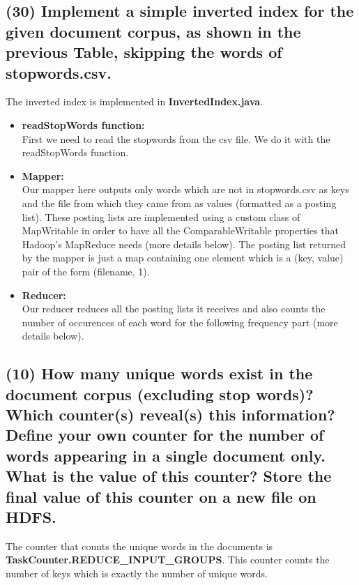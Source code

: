 \documentclass[a4paper,10pt]{article}
\begin{document}
\subsection{(30) Implement a simple inverted index for the given document corpus, as shown in
the previous Table, skipping the words of stopwords.csv.}
The inverted index is implemented in \textbf{InvertedIndex.java}.
\begin{itemize}
  \item \textbf{readStopWords function:}\\
  First we need to read the stopwords from the csv file. We do it with the readStopWords function.
  

  \item \textbf{Mapper:}\\
  Our mapper here outputs only words which are not in stopwords.csv as keys and
  the file from which they came from as values (formatted as a posting list).
  These posting lists are implemented using a custom class of MapWritable in order
  to have all the ComparableWritable properties that Hadoop's MapReduce needs (more details below).
  The posting list returned by the mapper is just a map containing one element
  which is a (key, value) pair of the form (filename, 1).
  

  \item \textbf{Reducer:}\\
  Our reducer reduces all the posting lists it receives and also counts the number
  of occurences of each word for the following frequency part (more details below).
  
\end{itemize}

\subsection{(10) How many unique words exist in the document corpus (excluding stop words)?
Which counter(s) reveal(s) this information? Define your own counter for the number
of words appearing in a single document only. What is the value of this counter? Store
the final value of this counter on a new file on HDFS.}
The counter that counts the unique words in the documents is \textbf{TaskCounter.REDUCE\_INPUT\_GROUPS}.
This counter counts the number of keys which is exactly the number of unique words.
\end{document}
